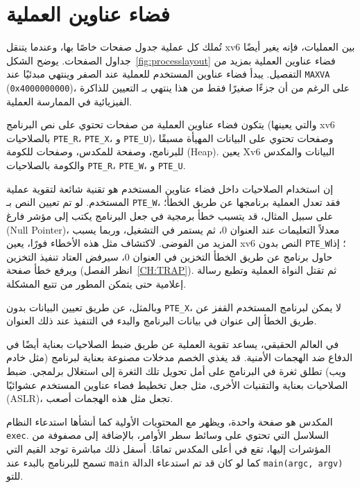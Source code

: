 \section{فضاء عناوين العملية}
\label{sec:process_address_space}

تُملك كل عملية جدول صفحات خاصًا بها، وعندما يتنقل xv6 بين العمليات، فإنه يغير أيضًا جداول الصفحات.
يوضح الشكل~\ref{fig:processlayout} فضاء عناوين العملية بمزيد من التفصيل.
يبدأ فضاء عناوين المستخدم للعملية عند الصفر وينتهي مبدئيًا عند \texttt{MAXVA} ({\tt 0x4000000000})،
على الرغم من أن جزءًا صغيرًا فقط من هذا ينتهي بـ التعيين للذاكرة الفيزيائية في الممارسة العملية.

يتكون فضاء عناوين العملية من صفحات تحتوي على نص البرنامج (والتي يعينها xv6 بالصلاحيات \lstinline{PTE_R}، \lstinline{PTE_X}، و \lstinline{PTE_U})،
وصفحات تحتوي على البيانات المهيأة مسبقًا للبرنامج، وصفحة للمكدس، وصفحات للكومة (Heap).
يعين Xv6 البيانات والمكدس والكومة بالصلاحيات \lstinline{PTE_R}، \lstinline{PTE_W}، و \lstinline{PTE_U}.

إن استخدام الصلاحيات داخل فضاء عناوين المستخدم هو تقنية شائعة لتقوية عملية المستخدم.
لو تم تعيين النص بـ \lstinline{PTE_W}، فقد تعدل العملية برنامجها عن طريق الخطأ؛
على سبيل المثال، قد يتسبب خطأ برمجية في جعل البرنامج يكتب إلى مؤشر فارغ (Null Pointer)، معدلاً التعليمات عند العنوان 0، ثم يستمر في التشغيل، وربما يسبب المزيد من الفوضى.
لاكتشاف مثل هذه الأخطاء فورًا، يعين xv6 النص بدون \lstinline{PTE_W}؛ إذا حاول برنامج عن طريق الخطأ التخزين في العنوان 0، سيرفض العتاد تنفيذ التخزين ويرفع خطأ صفحة (انظر الفصل~\ref{CH:TRAP}).
ثم تقتل النواة العملية وتطبع رسالة إعلامية حتى يتمكن المطور من تتبع المشكلة.

وبالمثل، عن طريق تعيين البيانات بدون \lstinline{PTE_X}، لا يمكن لبرنامج المستخدم القفز عن طريق الخطأ إلى عنوان في بيانات البرنامج والبدء في التنفيذ عند ذلك العنوان.

في العالم الحقيقي، يساعد تقوية العملية عن طريق ضبط الصلاحيات بعناية أيضًا في الدفاع ضد الهجمات الأمنية.
قد يغذي الخصم مدخلات مصنوعة بعناية لبرنامج (مثل خادم ويب) تطلق ثغرة في البرنامج على أمل تحويل تلك الثغرة إلى استغلال برلمجي.
ضبط الصلاحيات بعناية والتقنيات الأخرى، مثل جعل تخطيط فضاء عناوين المستخدم عشوائيًا (ASLR)، تجعل مثل هذه الهجمات أصعب.

المكدس هو صفحة واحدة، ويظهر مع المحتويات الأولية كما أنشأها استدعاء النظام {\tt exec}.
السلاسل التي تحتوي على وسائط سطر الأوامر، بالإضافة إلى مصفوفة من المؤشرات إليها، تقع في أعلى المكدس تمامًا.
أسفل ذلك مباشرة توجد القيم التي تسمح للبرنامج بالبدء عند \lstinline{main} كما لو كان قد تم استدعاء الدالة \lstinline{main(argc, argv)} للتو.

